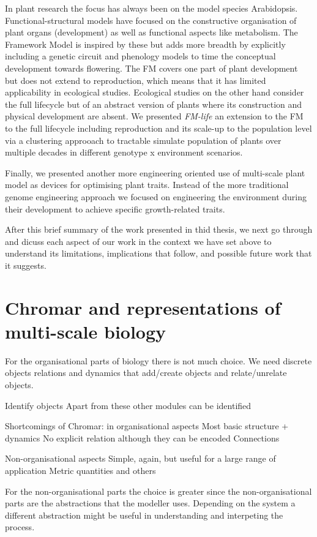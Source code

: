 \documentclass[phd]{infthesis}
\begin{document}
In plant research the focus has always been on the model species
Arabidopsis. Functional-structural models have focused on the constructive
organisation of plant organs (development) as well as functional aspects like
metabolism. The Framework Model is inspired by these but adds more breadth by
explicitly including a genetic circuit and phenology models to time the
conceptual development towards flowering. The FM covers one part of plant
development but does not extend to reproduction, which means that it has limited
applicability in ecological studies. Ecological studies on the other hand
consider the full lifecycle but of an abstract version of plants where its
construction and physical development are absent. We presented \emph{FM-life}
an extension to the FM to the full lifecycle including reproduction and its
scale-up to the population level via a clustering approoach to tractable
simulate population of plants over multiple decades in different genotype x
environment scenarios.

Finally, we presented another more engineering oriented use of multi-scale plant
model as devices for optimising plant traits. Instead of the more traditional
genome engineering approach we focused on engineering the environment during
their development to achieve specific growth-related traits.

After this brief summary of the work presented in thid thesis, we next go
through and dicuss each aspect of our work in the context we have set above to
understand its limitations, implications that follow, and possible future work
that it suggests.



\section{Chromar and representations of multi-scale biology}
For the organisational parts of biology there is not much choice. We need
discrete objects relations and dynamics that add/create objects and
relate/unrelate objects.

Identify objects
Apart from these other modules can be identified

Shortcomings of Chromar:
in organisational aspects
Most basic structure + dynamics
No explicit relation although they can be encoded
Connections

Non-organisational aspects
Simple, again, but useful for a large range of application
Metric quantities and others

For the non-organisational parts the choice is greater since the
non-organisational parts are the abstractions that the modeller uses. Depending
on the system a different abstraction might be useful in understanding and
interpeting the process.
\end{document}
